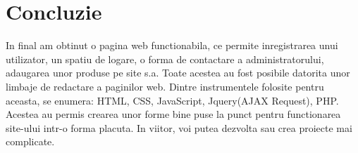 \section*{Concluzie}


In final am obtinut o pagina web functionabila, ce permite inregistrarea unui utilizator, un spatiu de logare, o forma de contactare a administratorului, adaugarea unor produse pe site s.a. Toate acestea au fost posibile datorita unor limbaje de redactare a paginilor web. Dintre instrumentele folosite pentru aceasta, se enumera: HTML, CSS, JavaScript, Jquery(AJAX Request), PHP. Acestea au permis crearea unor forme bine puse la punct pentru functionarea site-ului intr-o forma placuta. In viitor, voi putea dezvolta sau crea proiecte mai complicate.

\clearpage